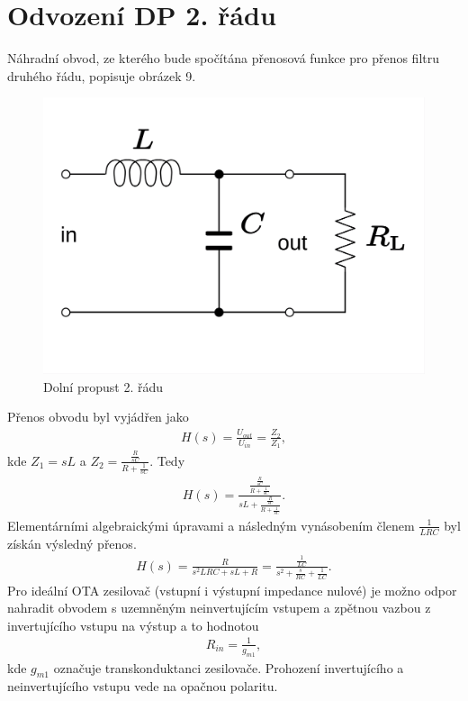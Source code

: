 \documentclass[twoside]{article}
\begin{document}
\section{Odvození DP 2. řádu}
Náhradní obvod, ze kterého bude spočítána přenosová funkce pro přenos filtru druhého řádu, popisuje obrázek 9.
\begin{figure}[H]
\centering
\includegraphics[scale=0.15]{RLC_low-pass.png}
\caption{Dolní propust 2. řádu \cite{7}}
\end{figure}
\noindent Přenos obvodu byl vyjádřen jako
\begin{align}
H(s) = \frac{U_{out}}{U_{in}} = \frac{Z_2}{Z_1},
\end{align}
kde $Z_1 = sL$ a $Z_2 = \frac{\frac{R}{sC}}{R + \frac{1}{sC}}$. Tedy
\begin{align}
H(s) = \frac{\frac{\frac{R}{sC}}{R + \frac{1}{sC}}}{sL + \frac{\frac{R}{sC}}{R + \frac{1}{sC}}}.
\end{align}
Elementárními algebraickými úpravami a následným vynásobením členem $\frac{1}{LRC}$ byl získán výsledný přenos.
\begin{align}
H(s) = \frac{R}{s^2LRC + sL + R} = \frac{\frac{1}{LC}}{s^2 + \frac{s}{RC} + \frac{1}{LC}}.
\end{align}
\noindent Pro ideální OTA zesilovač (vstupní i výstupní impedance nulové) je možno odpor nahradit obvodem s uzemněným neinvertujícím vstupem a zpětnou vazbou z invertujícího vstupu na výstup a to hodnotou
\begin{align}
R_{in} = \frac{1}{g_{m1}},
\end{align}
kde $g_{m1}$ označuje transkonduktanci zesilovače. Prohození invertujícího a neinvertujícího vstupu vede na opačnou polaritu.
\end{document}
